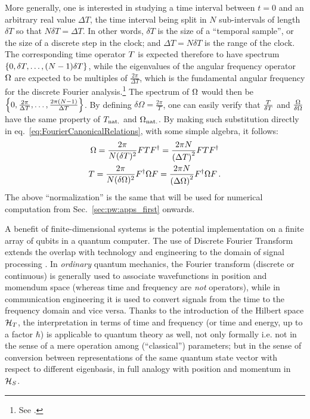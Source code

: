 More generally, one is interested in studying a time interval
between $t=0$ and an arbitrary real value $\Delta{T}$,
the time interval being split in $N$ sub-intervals of length $\delta{T}$
so that $N\delta{T} = \Delta{T}$.
In other words, $\delta T$
is the size of a ``temporal sample'', or the size of a discrete
step in the clock;
and $\Delta T = N\delta T$ is the range of the clock.
The corresponding time operator ${T}$
is expected therefore to have spectrum $\left\{0, \delta{T}, \dots, (N-1)\delta{T}\right\}$,
while the eigenvalues of the angular frequency operator ${\Omega}$
are expected to be multiples of
$\frac{2\pi}{\Delta{T}}$, which is
the fundamental
angular frequency for the discrete Fourier analysis.\footnote{
  See
  \cite[chapters
    ``The Discrete Fourier Transform'' and
    ``Fourier Analysis of Signals Using the Discrete Fourier Transform'']{Oppenheim:Int1,Oppenheim:Int3}.
}
The spectrum of ${\Omega}$ would then be $\left\{0, \frac{2\pi}{\Delta{T}}, \dots, \frac{2\pi(N-1)}{\Delta{T}}\right\}$.
By defining $\delta{\Omega} = \frac{2\pi}{T}$,
one can easily verify that $\frac{{T}}{\delta{T}}$ and $\frac{{\Omega}}{\delta{\Omega}}$
have the same property of ${T}_{\mathrm{nat.}}$ and ${\Omega}_{\mathrm{nat.}}$.  
By making such substitution directly in eq.~\eqref{eq:FourierCanonicalRelations},
with some simple algebra, it follows:
\begin{gather}
  \label{eq:SI_Fourier:Omega}
    {\Omega} = \frac{2\pi}{N(\delta T)^2} F {T} F^{\dagger} = \frac{2\pi N}{\qty(\Delta T)^2} F {T} F^{\dagger} \\
  \label{eq:SI_Fourier:T}
    {T} = \frac{2\pi}{N(\delta\Omega)^2} F^{\dagger} {\Omega} F = \frac{2\pi N}{\qty(\Delta\Omega)^2} F^{\dagger} {\Omega} F
  \, \text{.}
\end{gather}
The above ``normalization'' is the same that will be used
for numerical computation from Sec.~\ref{sec:pw:apps_first} onwards.



A benefit of finite-dimensional systems is the potential implementation on a finite array of
qubits in a quantum computer. The use of Discrete Fourier Transform extends the overlap
with technology and engineering to the domain of signal processing \parencite{FiniteHilb}.
In \emph{ordinary} quantum mechanics, the Fourier transform (discrete or continuous)
is generally used
to associate wavefunctions in position and momendum space
(whereas time and frequency are \emph{not} operators),
while in communication engineering it is used to convert signals
from the time to the frequency domain and vice versa.
Thanks to the introduction of the Hilbert space $\mathcal{H}_T$,
the interpretation in terms of time and frequency
(or time and energy, up to a factor $\hbar$)
is applicable to quantum theory as well, not only formally
i.e. not in the sense of a mere operation among (``classical'') parameters;
but in the sense of conversion between representations of the
same quantum state vector with respect to different eigenbasis,
in full analogy with position and momentum in $\mathcal{H}_S$.

